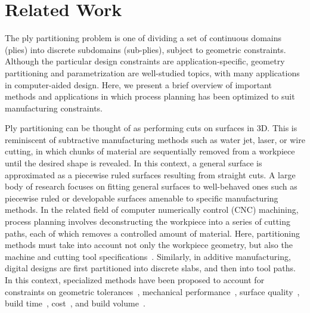 \section{Related Work}
\label{sec:related_work}

The ply partitioning problem is one of dividing a set of continuous domains (plies) into discrete subdomains (sub-plies), subject to geometric constraints. Although the particular design constraints are application-specific, geometry partitioning and parametrization are well-studied topics, with many applications in computer-aided design. Here, we present a brief overview of important methods and applications in which process planning has been optimized to suit manufacturing constraints.

Ply partitioning can be thought of as performing cuts on surfaces in 3D. This is reminiscent of subtractive manufacturing methods such as water jet, laser, or wire cutting, in which chunks of material are sequentially removed from a workpiece until the desired shape is revealed. In this context, a general surface is approximated as a piecewise ruled surfaces resulting from straight cuts. A large body of research focuses on fitting general surfaces to well-behaved ones such as piecewise ruled or developable surfaces amenable to specific manufacturing methods\cite{pottmann1999approximation, elber19975, subag2006piecewise}. In the related field of computer numerically control (CNC) machining, process planning involves deconstructing the workpiece into a series of cutting paths, each of which removes a controlled amount of material. Here, partitioning methods must take into account not only the workpiece geometry, but also the machine and cutting tool specifications~\cite{elber1993tool, kim2015precise}. Similarly, in additive manufacturing, digital designs are first partitioned into discrete slabs, and then into tool paths. In this context, specialized methods have been proposed to account for constraints on geometric tolerances~\cite{masood2000part, smith2002optimal, alexa2017optimal}, mechanical performance~\cite{ren2019thermo, tura2022characterization}, surface quality~\cite{thrimurthulu2004optimum, canellidis2006pre, delfs2016optimized, jin2017optimization}, build time~\cite{thrimurthulu2004optimum, canellidis2006pre, delfs2016optimized}, cost~\cite{alexander1998part}, and build volume~\cite{luo2012chopper}.

